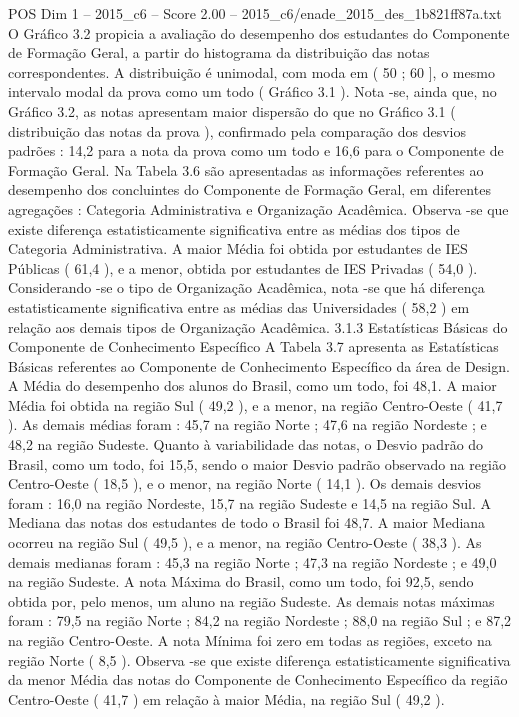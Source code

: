 \begin{textsample}{POS Dim 1 – 2015\_c6 – Score 2.00 – 2015\_c6/enade\_2015\_des\_1b821ff87a.txt}
O Gráfico 3.2 propicia a avaliação do desempenho dos estudantes do Componente de Formação Geral, a partir do histograma da distribuição das notas correspondentes.
A distribuição é unimodal, com moda em ( 50 ; 60 ], o mesmo intervalo modal da prova como um todo ( Gráfico 3.1 ).
Nota -se, ainda que, no Gráfico 3.2, as notas apresentam maior dispersão do que no Gráfico 3.1 ( distribuição das notas da prova ), confirmado pela comparação dos desvios padrões : 14,2 para a nota da prova como um todo e 16,6 para o Componente de Formação Geral.
Na Tabela 3.6 são apresentadas as informações referentes ao desempenho dos concluintes do Componente de Formação Geral, em diferentes agregações : Categoria Administrativa e Organização Acadêmica.
Observa -se que existe diferença estatisticamente significativa entre as médias dos tipos de Categoria Administrativa.
A maior Média foi obtida por estudantes de IES Públicas ( 61,4 ), e a menor, obtida por estudantes de IES Privadas ( 54,0 ).
Considerando -se o tipo de Organização Acadêmica, nota -se que há diferença estatisticamente significativa entre as médias das Universidades ( 58,2 ) em relação aos demais tipos de Organização Acadêmica. 3.1.3 Estatísticas Básicas do Componente de Conhecimento Específico A Tabela 3.7 apresenta as Estatísticas Básicas referentes ao Componente de Conhecimento Específico da área de Design.
A Média do desempenho dos alunos do Brasil, como um todo, foi 48,1.
A maior Média foi obtida na região Sul ( 49,2 ), e a menor, na região Centro-Oeste ( 41,7 ).
As demais médias foram : 45,7 na região Norte ; 47,6 na região Nordeste ; e 48,2 na região Sudeste.
Quanto à variabilidade das notas, o Desvio padrão do Brasil, como um todo, foi 15,5, sendo o maior Desvio padrão observado na região Centro-Oeste ( 18,5 ), e o menor, na região Norte ( 14,1 ).
Os demais desvios foram : 16,0 na região Nordeste, 15,7 na região Sudeste e 14,5 na região Sul.
A Mediana das notas dos estudantes de todo o Brasil foi 48,7.
A maior Mediana ocorreu na região Sul ( 49,5 ), e a menor, na região Centro-Oeste ( 38,3 ).
As demais medianas foram : 45,3 na região Norte ; 47,3 na região Nordeste ; e 49,0 na região Sudeste.
A nota Máxima do Brasil, como um todo, foi 92,5, sendo obtida por, pelo menos, um aluno na região Sudeste.
As demais notas máximas foram : 79,5 na região Norte ; 84,2 na região Nordeste ; 88,0 na região Sul ; e 87,2 na região Centro-Oeste.
A nota Mínima foi zero em todas as regiões, exceto na região Norte ( 8,5 ).
Observa -se que existe diferença estatisticamente significativa da menor Média das notas do Componente de Conhecimento Específico da região Centro-Oeste ( 41,7 ) em relação à maior Média, na região Sul ( 49,2 ).

\end{textsample}

